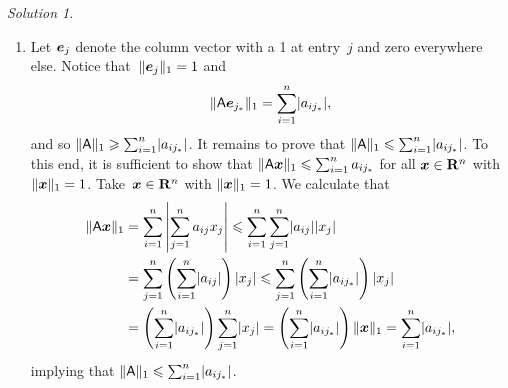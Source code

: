 \documentclass[11pt]{article}
\theoremstyle{definition}
\theoremstyle{remark}
\newtheorem*{protosolution}{Solution}
\newenvironment{solutionframe}
{%
    \begin{mdframed}[
        leftmargin=1cm,
        skipabove=.3cm,
        linecolor=blue,
        backgroundcolor=lightgreen,
        linewidth=0pt,
        innerleftmargin=.5em,
        innerrightmargin=.5em,
        innertopmargin=.3em,
        innerbottommargin=.6em,
    ]
}
{
    \end{mdframed}
}
\newenvironment{solution}
{\pushQED{\qed}\renewcommand{\qedsymbol}{$\triangle$}
\begin{solutionframe}\small \begin{protosolution}}
{\popQED\end{protosolution}\end{solutionframe}}
\begin{document}
\begin{solution}
    $~$
    \begin{enumerate}
        \item
            Let $\mathbf{\boldsymbol{e}}_j$ denote the column vector with a 1 at entry~$j$ and zero everywhere else.
            Notice that~$\lVert \mathbf{\boldsymbol{e}}_j \rVert_1 = 1$ and
            \[
                \lVert\mathsf A \mathbf{\boldsymbol{e}}_{j_*}\rVert_1 = \sum_{i=1}^{n} \lvert a_{ij_*} \rvert,
            \]
            and so $\lVert\mathsf A\rVert_1 \geqslant \sum_{i=1}^{n} \lvert a_{ij_*} \rvert$.
            It remains to prove that $\lVert\mathsf A\rVert_1 \leqslant \sum_{i=1}^{n} \lvert a_{ij_*} \rvert$.
            To this end,
            it is sufficient to show that $\lVert\mathsf A \mathbf{\boldsymbol{x}}\rVert_1 \leqslant \sum_{i=1}^{n} a_{ij_*}$ for all $\mathbf{\boldsymbol{x}} \in \mathbf R^n$ with $\lVert\mathbf{\boldsymbol{x}}\rVert_1 = 1$.
            Take~$\mathbf{\boldsymbol{x}} \in \mathbf R^n$ with $\lVert\mathbf{\boldsymbol{x}}\rVert_1 = 1$.
            We calculate that
            \begin{align*}
                \lVert\mathsf A \mathbf{\boldsymbol{x}}\rVert_1
                &= \sum_{i=1}^{n} \left\lvert \sum_{j=1}^{n} a_{ij} x_j \right\rvert
                \leqslant \sum_{i=1}^{n} \sum_{j=1}^{n} \lvert a_{ij} \rvert \lvert x_j \rvert  \\
                &=  \sum_{j=1}^{n} \left(\sum_{i=1}^{n} \lvert a_{ij} \rvert\right) \lvert x_j \rvert
                \leqslant \sum_{j=1}^{n} \left(\sum_{i=1}^{n} \lvert a_{ij_*} \rvert\right) \lvert x_j \rvert  \\
                &= \left(\sum_{i=1}^{n} \lvert a_{ij_*} \rvert\right) \sum_{j=1}^{n} \lvert x_j \rvert
                = \left(\sum_{i=1}^{n} \lvert a_{ij_*} \rvert\right) \lVert\mathbf{\boldsymbol{x}}\rVert_1 = \sum_{i=1}^{n}\lvert a_{ij_*} \rvert,
            \end{align*}
            implying that $\lVert\mathsf A\rVert_1 \leqslant \sum_{i=1}^{n}\lvert a_{ij_*} \rvert$.


\end{enumerate}
\end{solution}
\end{document}
